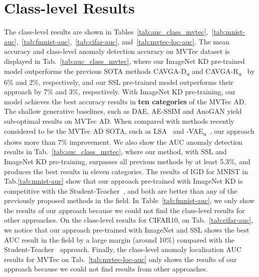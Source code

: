 \documentclass[letterpaper]{article} \usepackage{aaai22}  \usepackage{times}  \usepackage{helvet}  \usepackage{courier}  \usepackage[hyphens]{url}  \usepackage{graphicx} \urlstyle{rm} \def\UrlFont{\rm}  \usepackage{natbib}  \usepackage{caption} \DeclareCaptionStyle{ruled}{labelfont=normalfont,labelsep=colon,strut=off} \frenchspacing  \setlength{\pdfpagewidth}{8.5in}  \setlength{\pdfpageheight}{11in}  \usepackage{algorithm}
\begin{document}
\section{Class-level Results}
The class-level results are shown in Tables~\ref{tab:auc_class_mvtec},~\ref{tab:mnist-auc},~\ref{tab:fmnist-auc},~\ref{tab:cifar-auc},  and~\ref{tab:mvtec-loc-auc}.  
The mean accuracy and class-level anomaly detection accuracy on MVTec dataset is displayed in Tab.~\ref{tab:auc_class_mvtec}, where our ImageNet KD pre-trained model outperforms the previous SOTA methods CAVGA-D\textsubscript{u} and CAVGA-R\textsubscript{u}~\cite{venkataramanan2019attention} by 6\% and 2\%, respectively, and our SSL pre-trained model outperforms their approach by 7\% and 3\%, respectively. 
With ImageNet KD pre-training, our model achieves the best accuracy results in \textbf{ten categories} of the MVTec AD. The shallow generative baselines, such as DAE, AE-SSIM and AnoGAN yield sub-optimal results on MVTec AD. When compared with methods recently considered to be the MVTec AD SOTA, such as LSA~\cite{lsa} and -VAE\textsubscript{u}~\cite{lamda-vae}, our approach shows more than 7\% improvement. 
We also show the AUC anomaly detection results in Tab.~\ref{tab:auc_class_mvtec}, where our method, with SSL and ImageNet KD pre-training, surpasses all previous methods by at least 5.3\%, and produces the best results in eleven categories.  
The results of IGD for MNIST in Tab.\ref{tab:mnist-auc} show that our approach pre-trained with ImageNet KD is competitive with the Student-Teacher~\cite{bergmann2020uninformed}, and both are better than any of the previously proposed methods in the field. 
In Table~\ref{tab:fmnist-auc}, we only show the results of our approach because we could not find the class-level results for other approaches.
On the class-level results for CIFAR10, on Tab.~\ref{tab:cifar-auc}, we notice that our approach pre-trained with ImageNet and SSL shows the best AUC result in the field by a large margin (around 10\%) compared with the Student-Teacher~\cite{bergmann2020uninformed} approach. Finally, the class-level anomaly localisation AUC results for MVTec on Tab.~\ref{tab:mvtec-loc-auc} only shows the results of our approach because we could not find results from other approaches.
\end{document}
